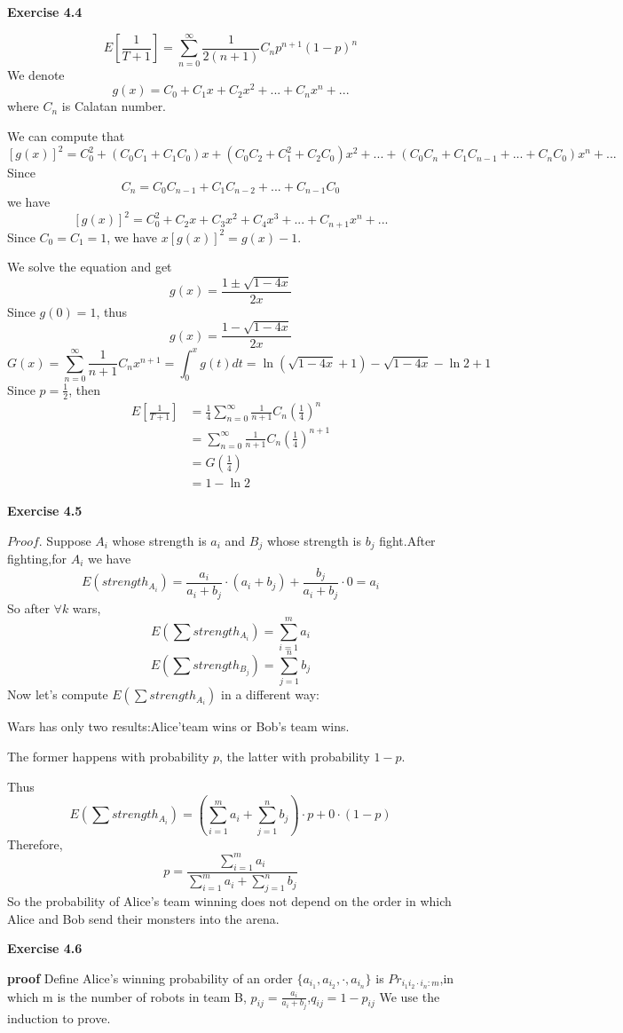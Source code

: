 \documentclass{article} %
\begin{document}
	\textbf{Exercise 4.4}\par
	$$E[\frac{1}{T+1}]=\sum_{n=0}^\infty \frac{1}{2(n+1)}C_{n}p^{n+1}(1-p)^{n}$$
	We denote $$g(x)=C_0+C_1x+C_2x^2+...+C_{n}x^{n}+...$$ where $C_{n}$ is Calatan number.\par
	We can compute that $$[g(x)]^2=C_0^2+(C_0C_1+C_1C_0)x+(C_0C_2+C_1^2+C_2C_0)x^2+...+(C_0C_{n}+C_1C_{n-1}+...+C_{n}C_0)x^{n}+...$$
	Since $$C_{n}=C_0C_{n-1}+C_1C_{n-2}+...+C_{n-1}C_0$$
	we have $$[g(x)]^2=C_0^2+C_2x+C_3x^2+C_4x^3+...+C_{n+1}x^{n}+...$$
	Since $C_0=C_1=1$, we have $x[g(x)]^2=g(x)-1$.\par
	We solve the equation and get
	$$g(x)=\frac{1\pm\sqrt{1-4x}}{2x}$$
	Since $g(0)=1$, thus 
	$$g(x)=\frac{1-\sqrt{1-4x}}{2x}$$
	$$G(x)=\sum_{n=0}^\infty \frac{1}{n+1}C_{n}x^{n+1}=\int_{0}^{x} g(t)dt=\ln(\sqrt{1-4x}+1)-\sqrt{1-4x}-\ln 2+1$$
	Since $p=\frac{1}{2}$, then 
	\begin{align*}
	E[\frac{1}{T+1}]&=\frac{1}{4}\sum_{n=0}^\infty \frac{1}{n+1}C_{n}(\frac{1}{4})^n\\
	&=\sum_{n=0}^\infty \frac{1}{n+1}C_{n}(\frac{1}{4})^{n+1}\\
	&=G(\frac{1}{4})\\
	&=1-\ln 2
	\end{align*}

    \textbf{Exercise 4.5}\par
    $Proof$.
    Suppose $A_i$ whose strength is $a_i$ and $B_j$ whose strength is $b_j$ fight.After fighting,for $A_i$ we have
    $$
    E(strength_{A_i})=\frac{a_i}{a_i+b_j}\cdot (a_i+b_j)+\frac{b_j}{a_i+b_j}\cdot 0=a_i
    $$
    So after $\forall k$ wars,
    $$
    E(\sum strength_{A_i})=\sum_{i=1}^{m}a_i
    $$
    $$
    E(\sum strength_{B_j})=\sum_{j=1}^{n}b_j
    $$
    Now let's compute $E(\sum strength_{A_i})$ in a different way:\par
    Wars has only two results:Alice'team wins or Bob's team wins.\par
    The former happens with probability $p$,
    the latter with probability $1-p$.\par
    Thus
    $$
    E(\sum strength_{A_i})=(\sum_{i=1}^{m}a_i+\sum_{j=1}^{n}b_j)\cdot p+0\cdot (1-p)
    $$
    Therefore,
    $$
    p=\frac{\sum_{i=1}^{m}a_i}{\sum_{i=1}^{m}a_i+\sum_{j=1}^{n}b_j}
    $$
    So the probability of Alice's team winning does not depend on the order in which Alice and Bob send their monsters into the arena.
 
   \textbf{Exercise 4.6}\par
	\textbf{proof} Define Alice's winning probability of an order $\{a_{i_1},a_{i_2},\cdot,a_{i_n}\}$ is $Pr_{i_1i_2 \cdot i_n:m}$,in which m is the number of robots in team B, $p_{ij}=\frac{a_i}{a_i+b_j}$,$q_{ij}=1-p_{ij}$  We use the induction to prove.\\
\end{document}
